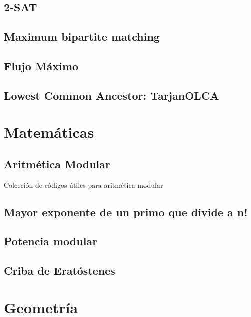 \documentclass[10pt,letterpaper,twocolumn,twosided]{article}
\newcommand{\codigofuente}[1]{

\dotfill
}
\begin{document}
\subsection{2-SAT}

\subsection{Maximum bipartite matching}

\subsection{Flujo Máximo}

\subsection{Lowest Common Ancestor: TarjanOLCA}

\section{Matemáticas}

\subsection{Aritmética Modular}

Colección de códigos útiles para aritmética modular\\
\codigofuente{../src/euclidean.${EXT}}%

\subsection{Mayor exponente de un primo que divide a n!}
\codigofuente{../src/mate/pow_div.${EXT}}%


\subsection{Potencia modular}

\subsection{Criba de Eratóstenes}



\section{Geometría}
\end{document}
